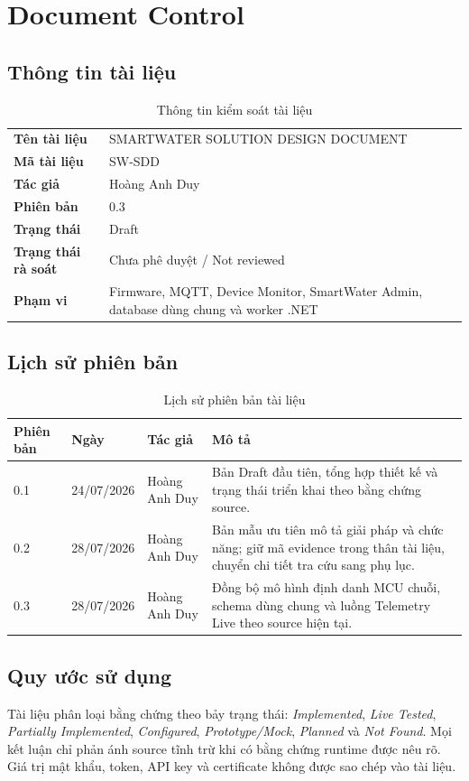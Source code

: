 \chapter*{Document Control}

\section*{Thông tin tài liệu}
\begin{table}[H]
\centering
\begin{tabularx}{\textwidth}{>{\bfseries}p{}X}
\toprule
Tên tài liệu & SMARTWATER SOLUTION DESIGN DOCUMENT \\
Mã tài liệu & SW-SDD \\
Tác giả & Hoàng Anh Duy \\
Phiên bản & 0.3 \\
Trạng thái & Draft \\
Trạng thái rà soát & Chưa phê duyệt / Not reviewed \\
Phạm vi & Firmware, MQTT, Device Monitor, SmartWater Admin, database dùng chung và worker .NET \\
\bottomrule
\end{tabularx}
\caption{Thông tin kiểm soát tài liệu}
\end{table}

\section*{Lịch sử phiên bản}
\begin{table}[H]
\centering
\begin{tabularx}{\textwidth}{p{}p{}p{}X}
\toprule
\textbf{Phiên bản} & \textbf{Ngày} & \textbf{Tác giả} & \textbf{Mô tả} \\
\midrule
0.1 & 24/07/2026 & Hoàng Anh Duy & Bản Draft đầu tiên, tổng hợp thiết kế và trạng thái triển khai theo bằng chứng source. \\
0.2 & 28/07/2026 & Hoàng Anh Duy & Bản mẫu ưu tiên mô tả giải pháp và chức năng; giữ mã evidence trong thân tài liệu, chuyển chi tiết tra cứu sang phụ lục. \\
0.3 & 28/07/2026 & Hoàng Anh Duy & Đồng bộ mô hình định danh MCU chuỗi, schema dùng chung và luồng Telemetry Live theo source hiện tại. \\
\bottomrule
\end{tabularx}
\caption{Lịch sử phiên bản tài liệu}
\end{table}

\section*{Quy ước sử dụng}
Tài liệu phân loại bằng chứng theo bảy trạng thái: \textit{Implemented}, \textit{Live Tested},
\textit{Partially Implemented}, \textit{Configured}, \textit{Prototype/Mock},
\textit{Planned} và \textit{Not Found}. Mọi kết luận chỉ phản ánh source tĩnh trừ khi
có bằng chứng runtime được nêu rõ. Giá trị mật khẩu, token, API key và certificate
không được sao chép vào tài liệu.

\clearpage

